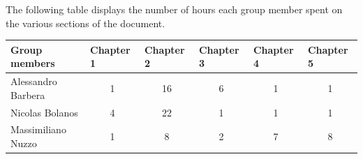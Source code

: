 The following table displays the number of hours each group member spent on the various sections of the document.


\begin{table}[ht]
\begin{tabular}{|l|c|c|c|c|c|}
\hline
\textbf{Group members}      & \multicolumn{1}{l|}{\textbf{Chapter 1}} & \multicolumn{1}{l|}{\textbf{Chapter 2}} & \multicolumn{1}{l|}{\textbf{Chapter 3}} & \multicolumn{1}{l|}{\textbf{Chapter 4}} & \multicolumn{1}{l|}{\textbf{Chapter 5}} \\ \hline
Alessandro Barbera &      1                        &     16                          &             6                  &        1        &       1       \\ \hline
Nicolas Bolanos    &     4                         &         22                      &     1                         &          1       &      1      \\ \hline
Massimiliano Nuzzo &   1                          &    8                          &   2                         &  7                  &  8       \\ \hline
\end{tabular}
\end{table}
